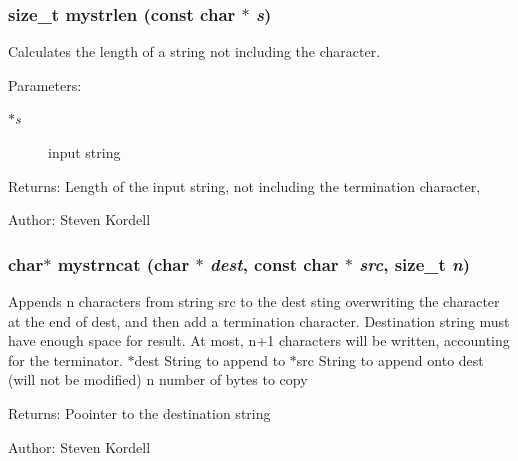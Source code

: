 \subsubsection{\setlength{\rightskip}{0pt plus 5cm}size\_\-t mystrlen (const char $\ast$ {\em s})}\label{mystringbackup_8c_f1b6719e84687596b7c8c4c9e146bc42}


Calculates the length of a string not including the  character. \begin{Desc}
\item[Parameters:]
\begin{description}
\item[{\em $\ast$s}]input string \end{description}
\end{Desc}
\begin{Desc}
\item[Returns:]Length of the input string, not including the termination character,  \end{Desc}
\begin{Desc}
\item[Author:]Steven Kordell \end{Desc}
\subsubsection{\setlength{\rightskip}{0pt plus 5cm}char$\ast$ mystrncat (char $\ast$ {\em dest}, const char $\ast$ {\em src}, size\_\-t {\em n})}\label{mystringbackup_8c_8ccb44f981aac19c052eb611bc38b197}


Appends n characters from string src to the dest sting overwriting the  character at the end of dest, and then add a termination  character. Destination string must have enough space for result. At most, n+1 characters will be written, accounting for the terminator.  $\ast$dest String to append to  $\ast$src String to append onto dest (will not be modified)  n number of bytes to copy \begin{Desc}
\item[Returns:]Poointer to the destination string \end{Desc}
\begin{Desc}
\item[Author:]Steven Kordell \end{Desc}

